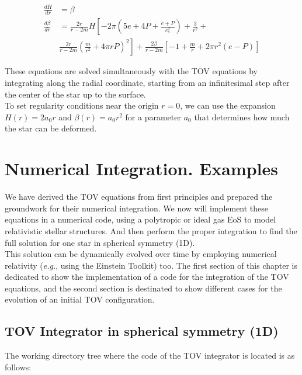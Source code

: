 \documentclass[12pt]{report}
\begin{document}
	\begin{align}
		\frac{dH}{dr} &= \beta \\
		\frac{d\beta}{dr} &= \frac{2r}{r-2m}H\left[-2\pi\left(5e+4P+\frac{e+P}{c_s^2}\right)+\frac{3}{r^2}+ \right. \nonumber\\
		&\left. \frac{2r}{r-2m}\left(\frac{m}{r^2}+4\pi r P\right)^2\right]+\frac{2\beta}{r-2m}\left[-1+\frac{m}{r}+2\pi r^2(e-P)\right]
	\end{align}
	
	These equations are solved simultaneously with the TOV equations by integrating along the radial coordinate, starting from an infinitesimal step after the center of the star up to the surface.\\
	
	To set regularity conditions near the origin $r=0$, we can use the expansion $H(r)=2a_0r$ and $\beta(r)=a_0r^2$ for a parameter $a_0$ that determines how much the star can be deformed.
	
	\chapter{Numerical Integration. Examples}
	We have derived the TOV equations from first principles and prepared the groundwork for their numerical integration. We now will implement these equations in a numerical code, using a polytropic or ideal gas EoS to model relativistic stellar structures. And then perform the proper integration to find the full solution for one star in spherical symmetry (1D).\\
	
	This solution can be dynamically evolved over time by employing numerical relativity (\textit{e.g.}, using the Einstein Toolkit) too. The first section of this chapter is dedicated to show the implementation of a code for the integration of the TOV equations, and the second section is destinated to show different cases for the evolution of an initial TOV configuration.
	\section{TOV Integrator in spherical symmetry (1D)}
	The working directory tree where the code of the TOV integrator is located is as follows:
	\vspace{0.5cm}
	
\end{document}
